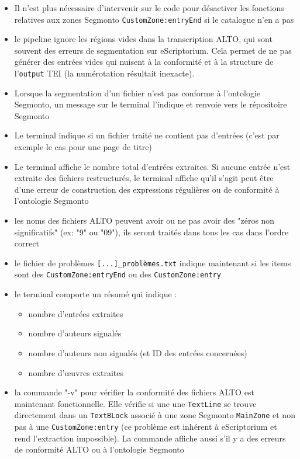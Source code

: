 \documentclass[a4paper,12pt,twoside]{book}
\begin{document}
\begin{itemize}
	\item Il n'est plus nécessaire d'intervenir sur le code pour désactiver les fonctions relatives aux zones Segmonto \texttt{CustomZone:entryEnd} si le catalogue n'en a pas
	\item le pipeline ignore les régions vides dans la transcription ALTO, qui sont souvent des erreurs de segmentation sur eScriptorium. Cela permet de ne pas générer des entrées vides qui nuisent à la conformité et à la structure de l'\texttt{output} TEI (la numérotation résultait inexacte).
	\item Lorsque la segmentation d'un fichier n'est pas conforme à l'ontologie Segmonto, un message sur le terminal l'indique et renvoie vers le répositoire Segmonto 
	\item Le terminal indique si un fichier traité ne contient pas d'entrées (c'est par exemple le cas pour une page de titre)
	\item Le terminal affiche le nombre total d'entrées extraites. Si aucune entrée n'est extraite des fichiers restructurés, le terminal affiche qu'il s'agit peut être d'une erreur de construction des expressions régulières ou de conformité à l'ontologie Segmonto
	\item les noms des fichiers ALTO peuvent avoir ou ne pas avoir des "zéros non significatifs" (ex:  "9" ou "09"), ils seront traités dans tous les cas dans l'ordre correct
	\item le fichier de problèmes \texttt{[...]\_problèmes.txt} indique maintenant si les items sont des \texttt{CustomZone:entryEnd} ou des \texttt{CustomZone:entry}
	\item le terminal comporte un résumé qui indique : 
	\begin{itemize}
		\item nombre d'entrées extraites
		\item nombre d'auteurs signalés
		\item nombre d'auteurs non signalés (et ID des entrées concernées)
		\item nombre d'œuvres extraites
	\end{itemize}
	\item la commande "-v" pour vérifier la conformité des fichiers ALTO est maintenant fonctionnelle. Elle vérifie si une une \texttt{TextLine} se trouve directement dans un \texttt{TextBLock} associé à une zone Segmonto \texttt{MainZone} et non pas à une \texttt{CustomZone:entry} (ce problème est inhérent à eScriptorium et rend l'extraction impossible). La commande affiche aussi s'il y a des erreurs de conformité ALTO ou à l'ontologie Segmonto

\end{itemize}
\end{document}
